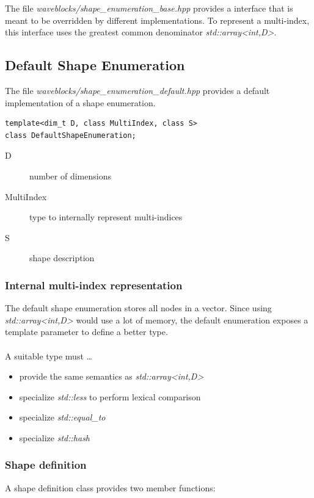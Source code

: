 \documentclass{article}
\begin{document}
The file \emph{waveblocks/shape\_enumeration\_base.hpp} provides a interface that is meant to be overridden by different implementations. To represent a multi-index, this interface uses the greatest common denominator \emph{std::array\textless int,D\textgreater}. 

\subsection{Default Shape Enumeration}

The file \emph{waveblocks/shape\_enumeration\_default.hpp} provides a default implementation of a shape enumeration.

\begin{verbatim}
template<dim_t D, class MultiIndex, class S>
class DefaultShapeEnumeration;
\end{verbatim}

\begin{description}
\item[D] number of dimensions
\item[MultiIndex] type to internally represent multi-indices
\item[S] shape description
\end{description}

\subsubsection{Internal multi-index representation}
The default shape enumeration stores all nodes in a vector. Since using \emph{std::array\textless int,D\textgreater} would use a lot of memory, the default enumeration exposes a template parameter to define a better type. \\ \\ A suitable type must \dots
\begin{itemize}
\item provide the same semantics as \emph{std::array\textless int,D\textgreater}
\item specialize \emph{std::less} to perform lexical comparison
\item specialize \emph{std::equal\_to}
\item specialize \emph{std::hash}
\end{itemize}

\subsubsection{Shape definition}
A shape definition class provides two member functions:
\end{document}
